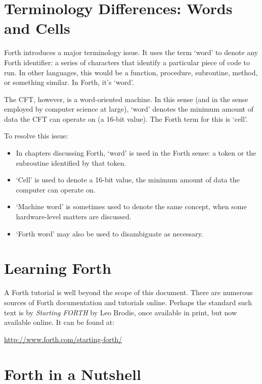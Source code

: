 \section{Terminology Differences: Words and Cells}

Forth introduces a major terminology issue. It uses the term ‘word’ to denote
any Forth identifier: a series of characters that identify a particular piece
of code to run. In other languages, this would be a function, procedure,
subroutine, method, or something similar. In Forth, it's ‘word’.

The CFT, however, is a word-oriented machine. In this sense (and in the sense
employed by computer science at large), ‘word’ denotes the minimum amount of
data the CFT can operate on (a 16-bit value). The Forth term for this is
‘cell’.

To resolve this issue:

\begin{itemize}
\item In chapters discussing Forth, ‘word’ is used in the Forth sense: a token
  or the subroutine identified by that token.
\item ‘Cell’ is used to denote a 16-bit value, the minimum amount of data the
  computer can operate on.
\item ‘Machine word’ is sometimes used to denote the same concept, when some
  hardware-level matters are discussed.
\item ‘Forth word’ may also be used to disambiguate as necessary.
\end{itemize}

\section{Learning Forth}

A Forth tutorial is well beyond the scope of this document. There are numerous
sources of Forth documentation and tutorials online. Perhaps the standard such
text is by {\em Starting FORTH\/} by Leo Brodie, once available in print, but
now available online. It can be found at:

\begin{center}
  \url{http://www.forth.com/starting-forth/}
\end{center}

\section{Forth in a Nutshell}

